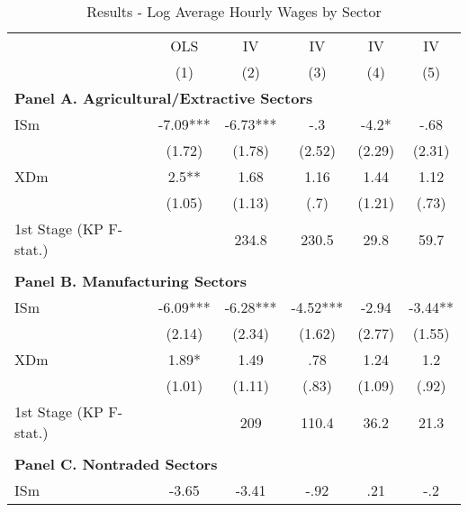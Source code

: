 \noindent \begin{center}
\begin{table}[h!]
\begin{center}
\protect\caption{\label{tab:Table_wages}Results - Log Average Hourly Wages by Sector}
\begin{centering}
\begin{tabular}{lccccc}
\hline 
 & {\footnotesize{}OLS } & {\footnotesize{}IV } & {\footnotesize{}IV } & {\footnotesize{}IV } & {\footnotesize{}IV }\tabularnewline
 & {\scriptsize{}(1)} & {\scriptsize{}(2)} & {\scriptsize{}(3)} & {\scriptsize{}(4)} & {\scriptsize{}(5)}\tabularnewline
\hline 
\multicolumn{6}{l}{\textbf{\footnotesize{}Panel A. Agricultural/Extractive Sectors}}\tabularnewline
{\footnotesize{}ISm} & {\footnotesize{} -7.09***} & {\footnotesize{} -6.73***} & {\footnotesize{} -.3} & {\footnotesize{} -4.2*} & {\footnotesize{} -.68}\tabularnewline
 & {\scriptsize{}(1.72)} & {\scriptsize{}(1.78)} & {\scriptsize{}(2.52)} & {\scriptsize{}(2.29)} & {\scriptsize{}(2.31)}\tabularnewline
{\footnotesize{}XDm} & {\footnotesize{} 2.5**} & {\footnotesize{} 1.68} & {\footnotesize{} 1.16} & {\footnotesize{} 1.44} & {\footnotesize{} 1.12}\tabularnewline
 & {\scriptsize{}(1.05)} & {\scriptsize{}(1.13)} & {\scriptsize{}(.7)} & {\scriptsize{}(1.21)} & {\scriptsize{}(.73)}\tabularnewline
{\scriptsize{}1st Stage (KP F-stat.)} &  & {\scriptsize{} 234.8} & {\scriptsize{} 230.5} & {\scriptsize{} 29.8} & {\scriptsize{} 59.7}\tabularnewline
 &  &  &  &  & \tabularnewline
\multicolumn{6}{l}{\textbf{\footnotesize{}Panel B. Manufacturing Sectors}}\tabularnewline
{\footnotesize{}ISm} & {\footnotesize{} -6.09***} & {\footnotesize{} -6.28***} & {\footnotesize{} -4.52***} & {\footnotesize{} -2.94} & {\footnotesize{} -3.44**}\tabularnewline
 & {\scriptsize{}(2.14)} & {\scriptsize{}(2.34)} & {\scriptsize{}(1.62)} & {\scriptsize{}(2.77)} & {\scriptsize{}(1.55)}\tabularnewline
{\footnotesize{}XDm} & {\footnotesize{} 1.89*} & {\footnotesize{} 1.49} & {\footnotesize{} .78} & {\footnotesize{} 1.24} & {\footnotesize{} 1.2}\tabularnewline
 & {\scriptsize{}(1.01)} & {\scriptsize{}(1.11)} & {\scriptsize{}(.83)} & {\scriptsize{}(1.09)} & {\scriptsize{}(.92)}\tabularnewline
{\scriptsize{}1st Stage (KP F-stat.)} &  & {\scriptsize{} 209} & {\scriptsize{} 110.4} & {\scriptsize{} 36.2} & {\scriptsize{} 21.3}\tabularnewline
 &  &  &  &  & \tabularnewline
\multicolumn{6}{l}{\textbf{\footnotesize{}Panel C. Nontraded Sectors}}\tabularnewline
{\footnotesize{}ISm} & {\footnotesize{} -3.65} & {\footnotesize{} -3.41} & {\footnotesize{} -.92} & {\footnotesize{} .21} & {\footnotesize{} -.2}\tabularnewline

\end{tabular}
\end{centering}
\end{center}
\end{table}
\end{center}
